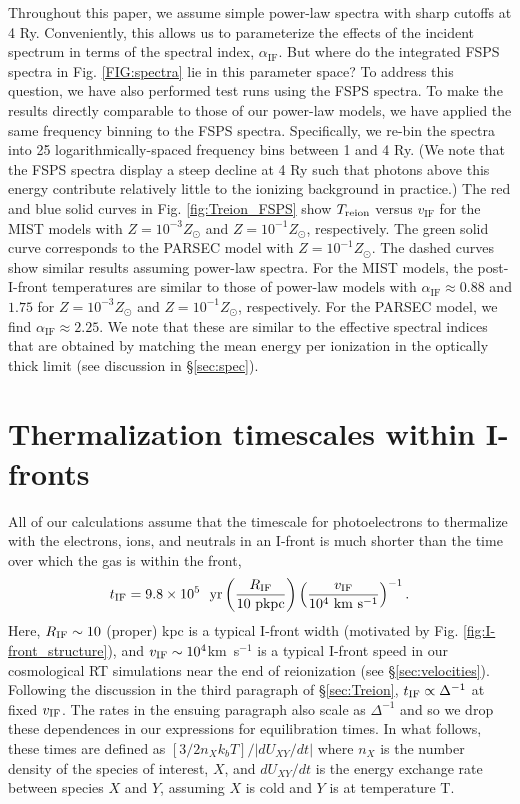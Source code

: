 \documentclass[twocolumn]{aastex62}
\newcommand{\Treion}{T_{\rm reion}}
\newcommand{\vIF}{v_{\mathrm{IF}}}
\newcommand{\spec}{\alpha_{\mathrm{IF}}}
\begin{document}
\begin{appendix}
Throughout this paper, we assume simple power-law spectra with sharp cutoffs at 4 Ry.  Conveniently, this allows us to parameterize the effects of the incident spectrum in terms of the spectral index, $\spec$.  But where do the integrated FSPS spectra in Fig. \ref{FIG:spectra} lie in this parameter space?  To address this question, we have also performed test runs using the FSPS spectra.   To make the results directly comparable to those of our power-law models, we have applied the same frequency binning to the FSPS spectra. Specifically, we re-bin the spectra into 25 logarithmically-spaced frequency bins between 1 and 4 Ry.  (We note that the FSPS spectra display a steep decline at 4 Ry such that photons above this energy contribute relatively little to the ionizing background in practice.)  The red and blue solid curves in Fig. \ref{fig:Treion_FSPS} show $\Treion$ versus $\vIF$ for the MIST models with $Z=10^{-3}Z_{\odot}$ and $Z=10^{-1}Z_{\odot}$, respectively.  The green solid curve corresponds to the PARSEC model with $Z=10^{-1}Z_{\odot}$.  The dashed curves show similar results assuming power-law spectra.  For the MIST models, the post-I-front temperatures are similar to those of power-law models with $\spec \approx 0.88$ and $1.75$ for $Z=10^{-3}Z_{\odot}$ and $Z=10^{-1}Z_{\odot}$, respectively.  For the PARSEC model, we find $\spec \approx 2.25$.  We note that these are similar to the effective spectral indices that are obtained by matching the mean energy per ionization in the optically thick limit (see discussion in \S \ref{sec:spec}). 

\section{Thermalization timescales within I-fronts}
\label{sec:thermalization}

All of our calculations assume that the timescale for photoelectrons to thermalize with the electrons, ions, and neutrals in an I-front is much shorter than the time over which the gas is within the front,
\begin{equation}
t_{\rm IF} = 9.8\times10^5 {\rm ~~ yr}\left(\frac{R_{\rm IF}}{\rm 10~ pkpc}\right) \left(\frac{v_{\rm IF}}{\rm 10^4~ km~s^{-1}}\right)^{-1}.
\label{EQ:tIF}
\end{equation}
Here, $R_{\rm IF}\sim 10$ (proper) kpc is a typical I-front width (motivated by Fig. \ref{fig:I-front_structure}), and $v_{\rm IF} \sim 10^4$km~s$^{-1}$ is a typical I-front speed in our cosmological RT simulations near the end of reionization (see \S \ref{sec:velocities}).  Following the discussion in the third paragraph of \S \ref{sec:Treion}, $t_{\rm IF} \propto \Delta^{-1}$ at fixed $v_{\rm IF}$. The rates in the ensuing paragraph also scale as $\Delta^{-1}$ and so we drop these dependences in our expressions for equilibration times.  In what follows, these times are defined as $[3/2 n_X k_b T] /|dU_{XY}/dt|$ where $n_X$ is the number density of the species of interest, $X$, and $dU_{XY}/dt$ is the energy exchange rate between species $X$ and $Y$, assuming $X$ is cold and $Y$ is at temperature T.  


\end{appendix}
\end{document}
